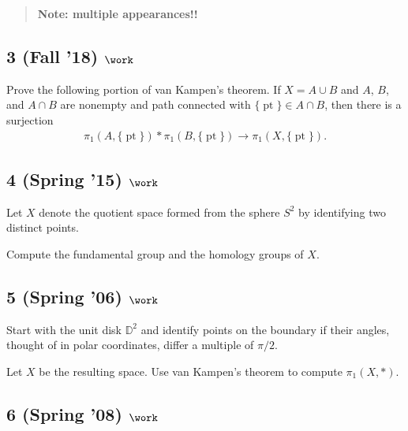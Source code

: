 \begin{quote}
\textbf{Note: multiple appearances!!}
\end{quote}

\hypertarget{fall-18-work-2}{%
\subsection{\texorpdfstring{3 (Fall '18)
\(\work\)}{3 (Fall '18) \textbackslash work}}\label{fall-18-work-2}}

Prove the following portion of van Kampen's theorem. If \(X = A\cup B\)
and \(A\), \(B\), and \(A \cap B\) are nonempty and path connected with
\({\{\operatorname{pt}\}}\in A \cap B\), then there is a surjection
\begin{align*}
\pi_1 (A, {\{\operatorname{pt}\}}) \ast \pi_1 (B, {\{\operatorname{pt}\}}) \to \pi_1 (X, {\{\operatorname{pt}\}})
.\end{align*}

\hypertarget{spring-15-work-1}{%
\subsection{\texorpdfstring{4 (Spring '15)
\(\work\)}{4 (Spring '15) \textbackslash work}}\label{spring-15-work-1}}

Let \(X\) denote the quotient space formed from the sphere \(S^2\) by
identifying two distinct points.

Compute the fundamental group and the homology groups of \(X\).

\hypertarget{spring-06-work-2}{%
\subsection{\texorpdfstring{5 (Spring '06)
\(\work\)}{5 (Spring '06) \textbackslash work}}\label{spring-06-work-2}}

Start with the unit disk \({\mathbb{D}}^2\) and identify points on the
boundary if their angles, thought of in polar coordinates, differ a
multiple of \(\pi/2\).

Let \(X\) be the resulting space. Use van Kampen's theorem to compute
\(\pi_1 (X, \ast)\).

\hypertarget{spring-08-work}{%
\subsection{\texorpdfstring{6 (Spring '08)
\(\work\)}{6 (Spring '08) \textbackslash work}}\label{spring-08-work}}

